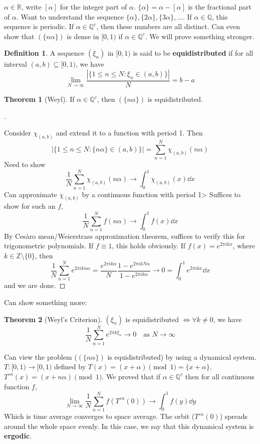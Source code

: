 \documentclass{article}
\theoremstyle{definition}
\newtheorem{thm}{Theorem}
\newtheorem{dfn}{Definition}
\newenvironment{proofs}[1][\proofname]{%
  \begin{proof}[#1]$ $\par\nobreak\ignorespaces
}{%
  \end{proof}
}
\newcommand{\QQ}{\mathbb Q}
\newcommand{\RR}{\mathbb R}
\newcommand{\ZZ}{\mathbb Z}
\newcommand{\Lra}{\Leftrightarrow}
\begin{document}
$\alpha \in \RR$, write $[\alpha]$ for the integer part of $\alpha$.
$\{\alpha\} = \alpha - [\alpha]$ is the fractional part of $\alpha$.
Want to understand the sequence $\{\alpha\}, \{2 \alpha\}, \{3 \alpha\}, ...$.
If $\alpha \in \QQ$, this sequence is periodic.
If $\alpha \in \QQ^c$, then these numbers are all distinct.
Can even show that $(\{n \alpha\})$ is dense in $[0, 1)$ if $\alpha \in \QQ^c$.
We will prove something stronger.

\begin{dfn}
	A sequence $(\xi_n)$ in $[0, 1)$ is said to be \textbf{equidistributed} if for all interval $(a, b) \subseteq [0, 1)$, we have
	\[
		\lim_{N \to \infty} \frac{|\{1 \leq n \leq N: \xi_n \in (a, b)\}|}{N} = b - a
	\]
\end{dfn}

\begin{thm}[Weyl]
	If $\alpha \in \QQ^c$, then $(\{n \alpha\})$ is equidistributed.
\end{thm}

\begin{proofs}
	Consider $\chi_{(a, b)}$ and extend it to a function with period 1.
	Then
	\[
		|\{1 \leq n \leq N: \{n \alpha\} \in (a, b)\}| = \sum_{n = 1}^N \chi_{(a, b)}(n \alpha)
	\]
	Need to show
	\[
		\frac{1}{N} \sum_{n = 1}^N \chi_{(a, b)}(n \alpha) \to \int_0^1 \chi_{(a, b)}(x) \dd{x}
	\]
	Can approximate $\chi_{(a, b)}$ by a continuous function with period 1>
	Suffices to show for such an $f$, 
	\[
		\frac{1}{N} \sum_{n = 1}^N f(n \alpha) \to \int_0^1 f(x) \dd{x}
	\]
	By Ces\`aro mean/Weierstrass approximation theorem, suffices to verify this for trigonometric polynomials.
	If $f \equiv 1$, this holds obviously.
	If $f(x) = e^{2 \pi i kx}$, where $k \in \ZZ \setminus \{0\}$, then
	\[
		\frac{1}{N} \sum_{n = 1}^N e^{2 \pi i kn \alpha} = \frac{e^{2 \pi i k \alpha}}{N} \frac{1 - e^{2 \pi  i k N \alpha}}{1 - e^{2 \pi i k \alpha}} \to 0 = \int_0^1 e^{2 \pi i k x} \dd{x}
	\]
	and we are done.
\end{proofs}

Can show something more:

\begin{thm}[Weyl's Criterion]
	$(\xi_n)$ is equidistributed $\Lra \forall k \neq 0$, we have
	\[
		\frac{1}{N} \sum_{n = 1}^N e^{2 \pi k \xi_n} \to 0 \quad \text{as }N \to \infty
	\]
\end{thm}

Can view the problem ($(\{n\alpha\})$ is equidistributed) by using a dynamical system.
$T:[0, 1) \to [0, 1)$ defined by $T(x) = (x + \alpha) \pmod{1} = \{x + \alpha\}$.
$T^{\circ n}(x) = (x + n \alpha) \pmod{1}$.
We proved that if $\alpha \in \QQ^c$ then for all continuous function $f$, 
\[
	\lim_{N \to \infty} \frac{1}{N} \sum_{n = 1}^N f( T^{\circ n}(0)) \to \int_0^1 f(y) \dd{y}
\]
Which is time average converges to space average.
The orbit ($T^{\circ n}(0)$) spreads around the whole space evenly.
In this case, we say that this dynamical system is \textbf{ergodic}. 
\end{document}
